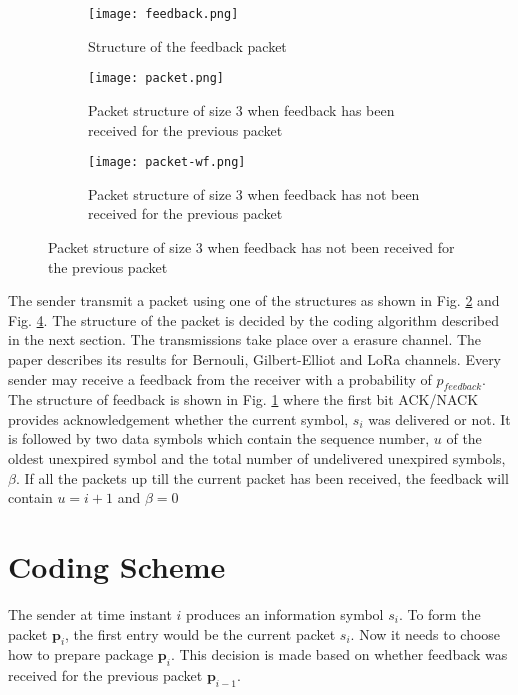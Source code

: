 \begin{figure}[h]
	\centering
	\begin{subfigure}
		\centering
		\texttt{[image: feedback.png]}
		\caption{Structure of the feedback packet}
		\label{feedback}
	\end{subfigure}
	
	\vspace{5ex}
	
	\begin{subfigure}
		\centering
		\texttt{[image: packet.png]}
		\caption{Packet structure of size 3 when feedback has been received for the previous packet}
		\label{packet}
	\end{subfigure}
	
	\vspace{5ex}
	
	\begin{subfigure}
		\centering
		\texttt{[image: packet-wf.png]}
		\caption{Packet structure of size 3 when feedback has not been received for the previous packet}
		\label{packet-wf}
	\end{subfigure}
	
\end{figure}

The sender transmit a packet using one of the structures as shown in Fig. \ref{packet} and Fig. \ref{packet-wf}. The structure of the packet is decided by the coding algorithm described in the next section. The transmissions take place over a erasure channel. The paper \cite{borkotokyicc} describes its results for Bernouli, Gilbert-Elliot and LoRa channels. Every sender may receive a feedback from the receiver with a probability of $p_{feedback}$. The structure of feedback is shown in Fig. \ref{feedback} where the first bit ACK/NACK provides acknowledgement whether the current symbol, $s_i$ was delivered or not. It is followed by two data symbols which contain the sequence number, $u$ of the oldest unexpired symbol and the total number of undelivered unexpired symbols, $\beta$. If all the packets up till the current packet has been received, the feedback will contain $u=i+1$ and $\beta = 0$


\section{Coding Scheme}

The sender at time instant $i$ produces an information symbol $s_i$. To form the packet $\mathbf{p}_i$, the first entry would be the current packet $s_i$. Now it needs to choose how to prepare package $\mathbf{p}_i$. This decision is made based on whether feedback was received for the previous packet $\mathbf{p}_{i-1}$.

